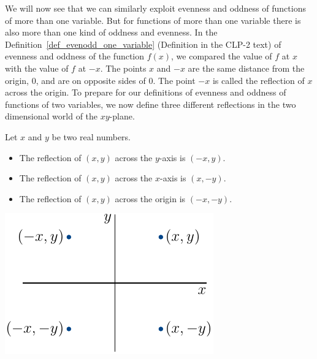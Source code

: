 We will now see that we can similarly exploit evenness and oddness of functions
of more than one variable. But for functions of more than one variable there is also more than one kind of oddness and evenness. In the 
Definition~\ref{def_evenodd_one_variable} (Definition   in the CLP-2 text) of evenness and oddness of the function $f(x)$, we compared the value of $f$ at $x$ with the value of $f$ at $-x$. The points $x$ and $-x$ are the same distance from the origin, $0$, and
are on opposite sides of $0$. The point $-x$ is called the reflection of $x$
across the origin. To prepare for our definitions of evenness and oddness of functions of two variables, we now define three different reflections 
in the two dimensional world of the $xy$-plane.
\begin{defn}\label{def_reflection_twod}
  Let $x$ and $y$ be two real numbers. 
 \begin{itemize}
  \item The reflection of $(x,y)$ across the $y$-axis is $(-x,y)$.
  \item The reflection of $(x,y)$ across the $x$-axis is $(x,-y)$.
  \item The reflection of $(x,y)$ across the origin is $(-x,-y)$.
 \end{itemize}
   \begin{efig}
    \begin{center}
        \includegraphics{refl2d.pdf}
    \end{center}
    \end{efig}
\end{defn}
